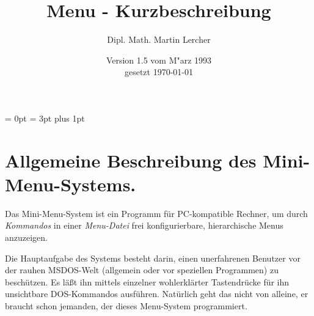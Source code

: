 
%
%
%      
%
%
%
\parindent = 0pt
\parskip = 3pt plus 1pt
\hfuzz=3pt

\addtolength\topmargin{-27pt}
\addtolength\textheight{68pt}

\title{Menu - Kurzbeschreibung}
\author{Dipl.{} Math.{} Martin Lercher}
\date{Version 1.5 vom M"arz 1993\\gesetzt \today}

%
%
\def\<#1>{{\verb|<|\it #1\/\verb|>|}}

\onecolumn
\maketitle{}

%
%
%
%
\section{Allgemeine Beschreibung des Mini-Menu-Systems.}

Das Mini-Menu-System ist ein Programm f\"ur PC-kompatible Rechner,
um durch {\it Kommandos\/} in einer {\it Menu-Datei\/}
frei konfigurierbare, hierarchische Menus anzuzeigen.

Die Hauptaufgabe des Systems
besteht darin, einen unerfahrenen Benutzer vor der
rauhen MSDOS-Welt (allgemein oder vor speziellen Programmen) 
zu besch\"utzen. Es l\"a\ss t ihn mittels einzelner
wohl\-er\-kl\"ar\-ter Tastendr\"ucke 
f\"ur ihn unsichtbare DOS-Kommandos
ausf\"uhren. Na\-t\"ur\-lich geht das nicht von alleine, er
braucht schon jemanden, der dieses Menu-System programmiert.

